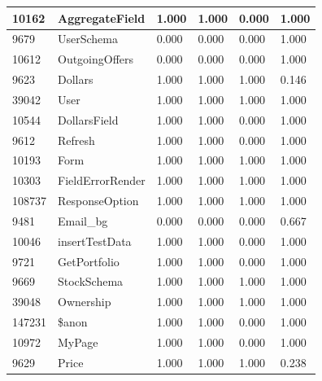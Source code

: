 \documentclass[a4paper]{article}
\newlength{\DUtablewidth} %
\begin{document}
\begin{longtable*}[c]{|p{0.160\DUtablewidth}|p{0.160\DUtablewidth}|p{0.160\DUtablewidth}|p{0.160\DUtablewidth}|p{0.160\DUtablewidth}|p{0.160\DUtablewidth}|}
10162
 & 
AggregateField
 & 
1.000
 & 
1.000
 & 
0.000
 & 
1.000
 \\
\hline

9679
 & 
UserSchema
 & 
0.000
 & 
0.000
 & 
0.000
 & 
1.000
 \\
\hline

10612
 & 
OutgoingOffers
 & 
0.000
 & 
0.000
 & 
0.000
 & 
1.000
 \\
\hline

9623
 & 
Dollars
 & 
1.000
 & 
1.000
 & 
1.000
 & 
0.146
 \\
\hline

39042
 & 
User
 & 
1.000
 & 
1.000
 & 
1.000
 & 
1.000
 \\
\hline

10544
 & 
DollarsField
 & 
1.000
 & 
1.000
 & 
0.000
 & 
1.000
 \\
\hline

9612
 & 
Refresh
 & 
1.000
 & 
1.000
 & 
0.000
 & 
1.000
 \\
\hline

10193
 & 
Form
 & 
1.000
 & 
1.000
 & 
1.000
 & 
1.000
 \\
\hline

10303
 & 
FieldErrorRender
 & 
1.000
 & 
1.000
 & 
1.000
 & 
1.000
 \\
\hline

108737
 & 
ResponseOption
 & 
1.000
 & 
1.000
 & 
1.000
 & 
1.000
 \\
\hline

9481
 & 
Email\_bg
 & 
0.000
 & 
0.000
 & 
0.000
 & 
0.667
 \\
\hline

10046
 & 
insertTestData
 & 
1.000
 & 
1.000
 & 
0.000
 & 
1.000
 \\
\hline

9721
 & 
GetPortfolio
 & 
1.000
 & 
1.000
 & 
0.000
 & 
1.000
 \\
\hline

9669
 & 
StockSchema
 & 
1.000
 & 
1.000
 & 
1.000
 & 
1.000
 \\
\hline

39048
 & 
Ownership
 & 
1.000
 & 
1.000
 & 
1.000
 & 
1.000
 \\
\hline

147231
 & 
\$anon
 & 
1.000
 & 
1.000
 & 
0.000
 & 
1.000
 \\
\hline

10972
 & 
MyPage
 & 
1.000
 & 
1.000
 & 
0.000
 & 
1.000
 \\
\hline

9629
 & 
Price
 & 
1.000
 & 
1.000
 & 
1.000
 & 
0.238
 \\
\hline


\end{longtable*}
\end{document}
